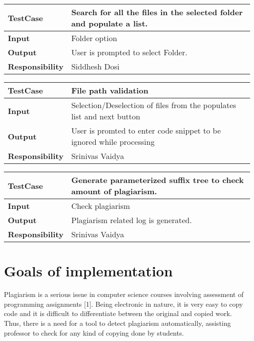 \documentclass[11pt]{article}
\begin{document}
  \begin{center}
    \begin{tabular}{ | l | p{10cm} |}
    \hline
    \textbf{TestCase} & Search for all the files in the selected folder and populate a list. \\ \hline
    \textbf{Input}      & Folder option \\ \hline
    \textbf{Output}     & User is prompted to select Folder. \\ \hline
   \textbf{Responsibility}     & Siddhesh Dosi  \\ \hline

    
    \end{tabular}
\end{center}

  \begin{center}
    \begin{tabular}{ | l | p{10cm} |}
    \hline
    \textbf{TestCase} & File path validation \\ \hline
    \textbf{Input}      & Selection/Deselection of files from the populates list and next button \\ \hline
    \textbf{Output}     & User is promted to enter code snippet to be ignored while processing \\ \hline
    \textbf{Responsibility}     & Srinivas Vaidya  \\ \hline

    
    \end{tabular}
\end{center}

  \begin{center}
    \begin{tabular}{ | l | p{10cm} |}
    \hline
    \textbf{TestCase} & Generate parameterized suffix tree to check amount of plagiarism. \\ \hline
    \textbf{Input}      & Check plagiarism \\ \hline
    \textbf{Output}     & Plagiarism related log is generated.  \\ \hline
    \textbf{Responsibility}     & Srinivas Vaidya  \\ \hline
    \end{tabular}
\end{center}                    

\section{Goals of implementation}

Plagiarism is a serious issue in computer
science courses involving assessment of programming
assignments [1]. Being electronic in nature, it is very easy to copy code and it is difficult to differentiate between the original and copied work. Thus, there is a need for a tool to detect plagiarism 
automatically, assisting professor to check for any kind of copying done by students.
\end{document}
